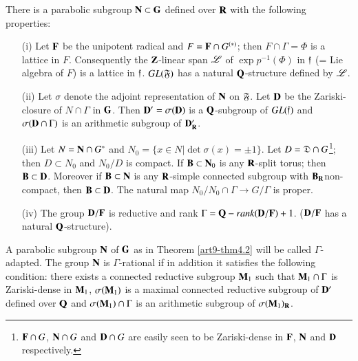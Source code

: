 \begin{theorem}\label{art9-thm4.2}
There is a parabolic subgroup $\mathbf{N} \subset \mathbf{G}$ defined over $\mathbf{R}$ with the following properties:
\begin{itemize}
\item[{\rm (i)}] Let $\mathbf{F}$ be the unipotent radical and $F = \mathbf{F} \cap G^{(\ast)}$; then $F \cap \Gamma = \Phi$ is a lattice in $F$. Consequently the $\mathbf{Z}$-linear span $\mathscr{L}$ of $\exp p^{-1}(\Phi)$ in $\mathfrak{f}$ (= Lie algebra of $F$) is a lattice in $\mathfrak{f}$. $GL (\mathfrak{F})$ has a natural $\mathbf{Q}$-structure defined by $\mathscr{L}$.

\item[{\rm (ii)}] Let $\sigma$ denote the adjoint representation of $\mathbf{N}$ on $\mathfrak{F}$. Let $\mathbf{D}$ be the Zariski-closure of $N \cap \Gamma$ in $\mathbf{G}$. Then $\mathbf{D}' = \sigma (\mathbf{D})$ is a $\mathbf{Q}$-subgroup of $GL(\mathfrak{f})$ and $\sigma (\mathbf{D} \cap \Gamma)$ is an arithmetic subgroup of $\mathbf{D}'_{\mathbf{R}}$.

\item[{\rm (iii)}] Let $N = \mathbf{N} \cap G^\ast$ and $N_0 =\{x \in N \big| \det \sigma (x) = \pm 1\}$. Let $D = \mathfrak{D} \cap G$\footnote{$\mathbf{F} \cap G$, $\mathbf{N} \cap G$ and $\mathbf{D} \cap G$ are easily seen to be Zariski-dense in $\mathbf{F}$, $\mathbf{N}$ and $\mathbf{D}$ respectively.}; then $D \subset N_0$ and $N_0 / D$ is compact. If $\mathbf{B} \subset \mathbf{N}_0$ is any $\mathbf{R}$-split torus; then $\mathbf{B} \subset \mathbf{D}$. Moreover if $\mathbf{B} \subset \mathbf{N}$ is any $\mathbf{R}$-simple connected subgroup with $\mathbf{B}_{\mathbf{R}}$\pageoriginale non-compact, then $\mathbf{B} \subset \mathbf{D}$. The natural map $N_0/N_0 \cap \Gamma \to G /\Gamma$ is proper.

\item[{\rm (iv)}] The group $\mathbf{D}/\mathbf{F}$ is reductive and rank $\Gamma = \mathbf{Q}-rank (\mathbf{D}/ \mathbf{F}) + 1$. ($\mathbf{D}/\mathbf{F}$ has a natural $\mathbf{Q}$-structure).
\end{itemize}
\end{theorem}

\begin{definition}\label{art9-def4.3}
A parabolic subgroup $\mathbf{N}$ of $\mathbf{G}$ as in Theorem \ref{art9-thm4.2} will be called $\Gamma$-adapted. The group $\mathbf{N}$ is $\Gamma$-rational if in addition it satisfies the following condition: there exists a connected reductive subgroup $\mathbf{M}_1$ such that $\mathbf{M}_1 \cap \Gamma$ is Zariski-dense in $\mathbf{M}_1$, $\sigma (\mathbf{M}_1)$ is a maximal connected reductive subgroup of $\mathbf{D}'$ defined over $\mathbf{Q}$ and $\sigma (\mathbf{M}_1) \cap \Gamma$ is an arithmetic subgroup of $\sigma (\mathbf{M}_1)_{\mathbf{R}}$. 
\end{definition}

